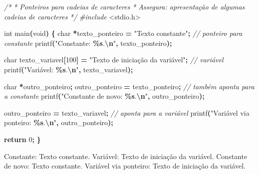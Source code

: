 \documentclass[
  11pt,
  a4paper,
]{scrbook}
\newenvironment{Shaded}{\begin{snugshade}}{\end{snugshade}}
\newcommand{\CommentTok}[1]{\textcolor[rgb]{0.56,0.35,0.01}{\textit{#1}}}
\newcommand{\ControlFlowTok}[1]{\textcolor[rgb]{0.13,0.29,0.53}{\textbf{#1}}}
\newcommand{\DataTypeTok}[1]{\textcolor[rgb]{0.13,0.29,0.53}{#1}}
\newcommand{\DecValTok}[1]{\textcolor[rgb]{0.00,0.00,0.81}{#1}}
\newcommand{\ImportTok}[1]{#1}
\newcommand{\NormalTok}[1]{#1}
\newcommand{\OperatorTok}[1]{\textcolor[rgb]{0.81,0.36,0.00}{\textbf{#1}}}
\newcommand{\PreprocessorTok}[1]{\textcolor[rgb]{0.56,0.35,0.01}{\textit{#1}}}
\newcommand{\SpecialCharTok}[1]{\textcolor[rgb]{0.81,0.36,0.00}{\textbf{#1}}}
\newcommand{\StringTok}[1]{\textcolor[rgb]{0.31,0.60,0.02}{#1}}
\begin{document}
\begin{Shaded}
\begin{Highlighting}[]
\CommentTok{/*}
\CommentTok{ * Ponteiros para cadeias de caracteres}
\CommentTok{ * Assegura: apresentação de algumas cadeias de caracteres}
\CommentTok{ */}
\PreprocessorTok{\#include }\ImportTok{\textless{}stdio.h\textgreater{}}

\DataTypeTok{int}\NormalTok{ main}\OperatorTok{(}\DataTypeTok{void}\OperatorTok{)} \OperatorTok{\{}
    \DataTypeTok{char} \OperatorTok{*}\NormalTok{texto\_ponteiro }\OperatorTok{=} \StringTok{"Texto constante"}\OperatorTok{;}  \CommentTok{// ponteiro para constante}
\NormalTok{    printf}\OperatorTok{(}\StringTok{"Constante: }\SpecialCharTok{\%s}\StringTok{.}\SpecialCharTok{\textbackslash{}n}\StringTok{"}\OperatorTok{,}\NormalTok{ texto\_ponteiro}\OperatorTok{);}

    \DataTypeTok{char}\NormalTok{ texto\_variavel}\OperatorTok{[}\DecValTok{100}\OperatorTok{]} \OperatorTok{=} \StringTok{"Texto de iniciação da variável"}\OperatorTok{;}  \CommentTok{// variável}
\NormalTok{    printf}\OperatorTok{(}\StringTok{"Variável: }\SpecialCharTok{\%s}\StringTok{.}\SpecialCharTok{\textbackslash{}n}\StringTok{"}\OperatorTok{,}\NormalTok{ texto\_variavel}\OperatorTok{);}

    \DataTypeTok{char} \OperatorTok{*}\NormalTok{outro\_ponteiro}\OperatorTok{;}
\NormalTok{    outro\_ponteiro }\OperatorTok{=}\NormalTok{ texto\_ponteiro}\OperatorTok{;}  \CommentTok{// também aponta para a constante}
\NormalTok{    printf}\OperatorTok{(}\StringTok{"Constante de novo: }\SpecialCharTok{\%s}\StringTok{.}\SpecialCharTok{\textbackslash{}n}\StringTok{"}\OperatorTok{,}\NormalTok{ outro\_ponteiro}\OperatorTok{);}

\NormalTok{    outro\_ponteiro }\OperatorTok{=}\NormalTok{ texto\_variavel}\OperatorTok{;}  \CommentTok{// aponta para a variável}
\NormalTok{    printf}\OperatorTok{(}\StringTok{"Variável via ponteiro: }\SpecialCharTok{\%s}\StringTok{.}\SpecialCharTok{\textbackslash{}n}\StringTok{"}\OperatorTok{,}\NormalTok{ outro\_ponteiro}\OperatorTok{);}
    
    \ControlFlowTok{return} \DecValTok{0}\OperatorTok{;}
\OperatorTok{\}}
\end{Highlighting}
\end{Shaded}

\begin{Shaded}
\begin{Highlighting}[]
\NormalTok{Constante: Texto constante.}
\NormalTok{Variável: Texto de iniciação da variável.}
\NormalTok{Constante de novo: Texto constante.}
\NormalTok{Variável via ponteiro: Texto de iniciação da variável.}
\end{Highlighting}
\end{Shaded}
\end{document}
